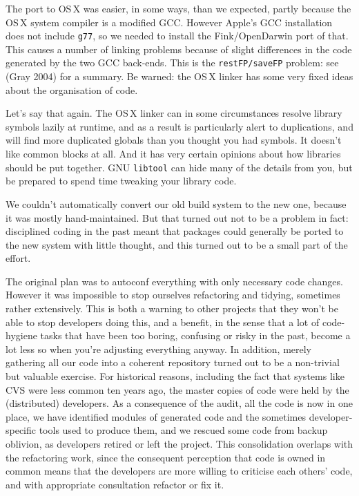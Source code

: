 \documentclass[11pt,twoside]{article}
\begin{document}
The port to OS\,X was easier, in some ways, than we expected, partly
because the OS\,X system compiler is a modified GCC.  However Apple's
GCC installation does not include \texttt{g77}, so we needed to
install the Fink/OpenDarwin port of that.  This causes a number of
linking problems because of slight differences in the code generated
by the two GCC back-ends.  This is the \texttt{restFP/saveFP} problem:
see (Gray 2004) for a summary.  Be warned: the OS\,X linker has some
very fixed ideas about the organisation of code.

Let's say that again.  The OS\,X linker can in some circumstances
resolve library symbols lazily at runtime, and as a result is particularly
alert to duplications, and will find more duplicated
globals than you thought you had symbols.  It doesn't like common
blocks at all.  And it has very certain opinions about how libraries
should be put together.  GNU \texttt{libtool} can hide many of the
details from you, but be prepared to spend time tweaking your library
code.

We couldn't automatically convert our old build system to the new one,
because it was mostly hand-maintained.  But that turned out not to be
a problem in fact: disciplined coding in the past meant that packages
could generally be ported to the new system with little thought, and
this turned out to be a small part of the effort.

The original plan was to autoconf everything with only necessary code
changes.  However it was impossible to stop ourselves refactoring and
tidying, sometimes rather extensively.  This is both a warning to
other projects that they won't be able to stop developers doing this,
and a benefit, in the sense that a lot of code-hygiene tasks that have
been too boring, confusing or risky in the past, become a lot less so
when you're adjusting everything anyway.  In addition, merely
gathering all our code into a coherent repository turned out to be a
non-trivial but valuable exercise.  For historical reasons, including
the fact that systems like CVS were less common ten years ago, the
master copies of code were held by the (distributed) developers.  As a
consequence of the audit, all the code is now in one place, we have
identified modules of generated code and the sometimes
developer-specific tools used to produce them, and we rescued some
code from backup oblivion, as developers retired or left the project.
This consolidation overlaps with the refactoring work, since the
consequent perception that code is owned in common means that the
developers are more willing to criticise each others' code, and with
appropriate consultation refactor or fix it.
\end{document}
